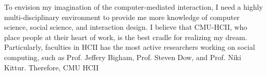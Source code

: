 \noindent
To envision my imagination of the computer-mediated interaction, 
I need a highly multi-disciplinary environment to provide me more knowledge of computer science, social science, and interaction design. 
I believe that CMU-HCII, who place people at their heart of work, is the best cradle for realizing my dream.
Particularly, faculties in HCII has the most active researchers working on social computing,
such as Prof. Jeffery Bigham, Prof. Steven Dow, and Prof. Niki Kittur. 
Therefore, CMU HCII \\ 



